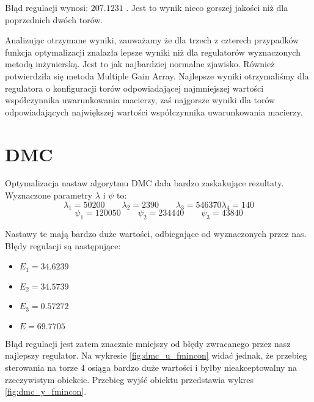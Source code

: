 Błąd regulacji wynosi: $\num{207,1231}$ .
Jest to wynik nieco gorszej jakości niż dla poprzednich dwóch torów.

Analizując otrzymane wyniki, zauważamy że dla trzech z czterech przypadków funkcja optymalizacji
znalazła lepsze wyniki niż dla regulatorów wyznaczonych metodą inżynierską. Jest to jak najbardziej normalne zjawisko.
Również potwierdziła się metoda Multiple Gain Array. Najlepsze wyniki otrzymaliśmy dla regulatora o konfiguracji
torów odpowiadającej najmniejszej wartości współczynnika uwarunkowania macierzy, zaś najgorsze wyniki
dla torów odpowiadających największej wartości współczynnika uwarunkowania macierzy.

\section{DMC}
Optymalizacja nastaw algorytmu DMC dała bardzo zaskakujące rezultaty. Wyznaczone parametry $\lambda$ i $\psi$ to:
\begin{equation}
\lambda_1=\num{50200} \qquad \lambda_2 = 2390 \qquad \lambda_3 = 546370 \lambda_4 = 140
\end{equation}
\begin{equation}
\psi_1 = 120050 \qquad \psi_2 = 234440 \qquad \psi_3 = 43840
\end{equation}

Nastawy te mają bardzo duże wartości, odbiegające od wyznaczonych przez nas. Błędy regulacji są następujące:
\begin{itemize}
\item $E_1 = \num{34,6239}$
\item $E_2 = \num{34,5739}$
\item $E_3 = \num{0,57272}$
\item $E = \num{69,7705}$
\end{itemize}
Błąd regulacji jest zatem znacznie mniejszy od błędy zwracanego przez nasz najlepszy regulator. Na wykresie \ref{fig:dmc_u_fmincon} widać jednak, że przebieg sterowania na torze 4 osiąga bardzo duże wartości i byłby nieakceptowalny na rzeczywistym obiekcie. Przebieg wyjść obiektu przedstawia wykres \ref{fig:dmc_y_fmincon}.


